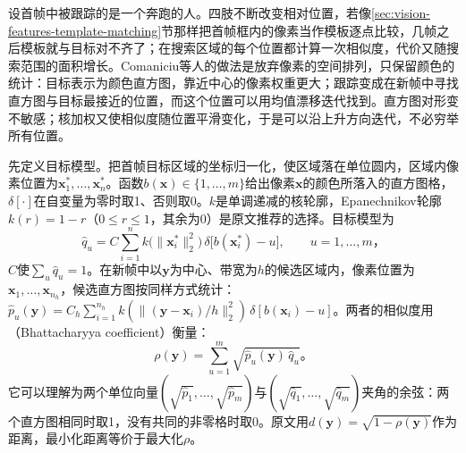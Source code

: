 设首帧中被跟踪的是一个奔跑的人。四肢不断改变相对位置，若像\ref{sec:vision-features-template-matching}节那样把首帧框内的像素当作模板逐点比较，几帧之后模板就与目标对不齐了；在搜索区域的每个位置都计算一次相似度，代价又随搜索范围的面积增长。Comaniciu等人的做法是放弃像素的空间排列，只保留颜色的统计：目标表示为颜色直方图，靠近中心的像素权重更大；跟踪变成在新帧中寻找直方图与目标最接近的位置，而这个位置可以用均值漂移迭代找到。直方图对形变不敏感；核加权又使相似度随位置平滑变化，于是可以沿上升方向迭代，不必穷举所有位置。

先定义目标模型。把首帧目标区域的坐标归一化，使区域落在单位圆内，区域内像素位置为$\bm{x}_1^*,\ldots,\bm{x}_{n}^*$。函数$b(\bm{x})\in\{1,\ldots,m\}$给出像素$\bm{x}$的颜色所落入的直方图格，$\delta[\cdot]$在自变量为零时取1、否则取0。$k$是单调递减的核轮廓，Epanechnikov轮廓$k(r)=1-r$（$0\leq r\leq1$，其余为0）是原文推荐的选择。目标模型为
\begin{equation}
  \widehat{q}_u=C\sum_{i=1}^{n}k\bigl(\lVert\bm{x}_i^*\rVert_2^2\bigr)\,\delta\bigl[b(\bm{x}_i^*)-u\bigr],
  \qquad u=1,\ldots,m\text{，}
  \label{eq:vision-video-meanshift-target}
\end{equation}
$C$使$\sum_u\widehat{q}_u=1$。在新帧中以$\bm{y}$为中心、带宽为$h$的候选区域内，像素位置为$\bm{x}_1,\ldots,\bm{x}_{n_h}$，候选直方图按同样方式统计：
$\widehat{p}_u(\bm{y})=C_h\sum_{i=1}^{n_h}k(\lVert(\bm{y}-\bm{x}_i)/h\rVert_2^2)\,\delta[b(\bm{x}_i)-u]$。两者的相似度用（Bhattacharyya coefficient）衡量：
\begin{equation}
  \rho(\bm{y})=\sum_{u=1}^{m}\sqrt{\widehat{p}_u(\bm{y})\,\widehat{q}_u}\text{。}
  \label{eq:vision-video-bhattacharyya}
\end{equation}
它可以理解为两个单位向量$(\sqrt{\widehat{p}_1},\ldots,\sqrt{\widehat{p}_m})$与$(\sqrt{\widehat{q}_1},\ldots,\sqrt{\widehat{q}_m})$夹角的余弦：两个直方图相同时取1，没有共同的非零格时取0。原文用$d(\bm{y})=\sqrt{1-\rho(\bm{y})}$作为距离，最小化距离等价于最大化$\rho$。

